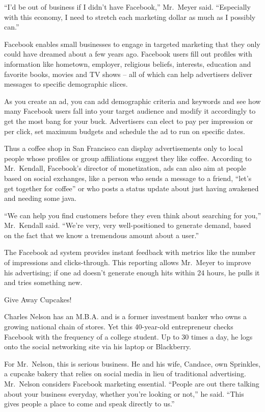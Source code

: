 ﻿\documentclass[12pt]{article}
\begin{document}
``I'd be out of business if I didn't have Facebook,'' Mr.~Meyer said. ``Especially with this
economy, I need to stretch each marketing dollar as much as I possibly can.''

Facebook enables small businesses to engage in targeted marketing that they only could have dreamed
about a few years ago. Facebook users fill out profiles with information like hometown, employer,
religious beliefs, interests, education and favorite books, movies and TV shows -- all of which can
help advertisers deliver messages to specific demographic slices.

As you create an ad, you can add demographic criteria and keywords and see how many Facebook users
fall into your target audience and modify it accordingly to get the most bang for your buck.
Advertisers can elect to pay per impression or per click, set maximum budgets and schedule the ad to
run on specific dates.

Thus a coffee shop in San Francisco can display advertisements only to local people whose profiles
or group affiliations suggest they like coffee. According to Mr.~Kendall, Facebook's director of
monetization, ads can also aim at people based on social exchanges, like a person who sends a
message to a friend, ``let's get together for coffee'' or who posts a status update about just
having awakened and needing some java.

``We can help you find customers before they even think about searching for you,'' Mr.~Kendall said.
``We're very, very well-positioned to generate demand, based on the fact that we know a tremendous
amount about a user.''

The Facebook ad system provides instant feedback with metrics like the number of impressions and
clicks-through. This reporting allows Mr.~Meyer to improve his advertising; if one ad doesn't
generate enough hits within 24 hours, he pulls it and tries something new.

Give Away Cupcakes!

Charles Nelson has an M.B.A. and is a former investment banker who owns a growing national chain of
stores. Yet this 40-year-old entrepreneur checks Facebook with the frequency of a college student.
Up to 30 times a day, he logs onto the social networking site via his laptop or Blackberry.

For Mr.~Nelson, this is serious business. He and his wife, Candace, own Sprinkles, a cupcake bakery
that relies on social media in lieu of traditional advertising. Mr.~Nelson considers Facebook
marketing essential. ``People are out there talking about your business everyday, whether you're
looking or not,'' he said. ``This gives people a place to come and speak directly to us.''
\end{document}
